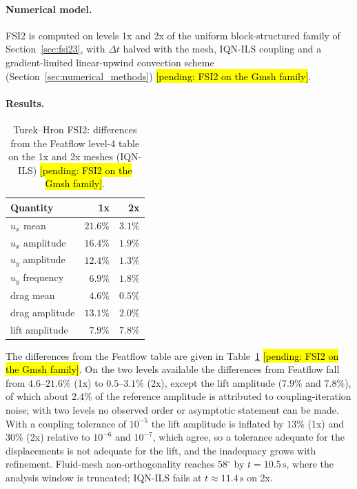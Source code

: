 \paragraph{Numerical model.}
FSI2 is computed on levels 1x and 2x of the uniform block-structured family of Section~\ref{sec:fsi23}, with $\Delta t$ halved with the mesh, IQN-ILS coupling and a gradient-limited linear-upwind convection scheme (Section~\ref{sec:numerical_methods}) \hl{[pending: FSI2 on the Gmsh family]}.

\paragraph{Results.}
\begin{table}[htbp]
	\centering
	\small
	\setlength{\tabcolsep}{5pt}
	\caption{Turek--Hron FSI2: differences from the Featflow level-4 table on the 1x and 2x meshes (IQN-ILS) \hl{[pending: FSI2 on the Gmsh family]}.}
	\label{tab:hronturek_fsi2}
	\begin{tabular}{lrr}
		\toprule
		Quantity & 1x & 2x \\
		\midrule
		$u_x$ mean & $21.6\%$ & $3.1\%$ \\
		$u_x$ amplitude & $16.4\%$ & $1.9\%$ \\
		$u_y$ amplitude & $12.4\%$ & $1.3\%$ \\
		$u_y$ frequency & $6.9\%$ & $1.8\%$ \\
		drag mean & $4.6\%$ & $0.5\%$ \\
		drag amplitude & $13.1\%$ & $2.0\%$ \\
		lift amplitude & $7.9\%$ & $7.8\%$ \\
		\bottomrule
	\end{tabular}
\end{table}

The differences from the Featflow table are given in Table~\ref{tab:hronturek_fsi2} \hl{[pending: FSI2 on the Gmsh family]}.
On the two levels available the differences from Featflow fall from $4.6$--$21.6\%$ (1x) to $0.5$--$3.1\%$ (2x), except the lift amplitude ($7.9\%$ and $7.8\%$), of which about $2.4\%$ of the reference amplitude is attributed to coupling-iteration noise; with two levels no observed order or asymptotic statement can be made. With a coupling tolerance of $10^{-5}$ the lift amplitude is inflated by $13\%$ (1x) and $30\%$ (2x) relative to $10^{-6}$ and $10^{-7}$, which agree, so a tolerance adequate for the displacements is not adequate for the lift, and the inadequacy grows with refinement. Fluid-mesh non-orthogonality reaches $58^\circ$ by $t = 10.5\,\mathrm{s}$, where the analysis window is truncated; IQN-ILS fails at $t \approx 11.4\,\mathrm{s}$ on 2x.


